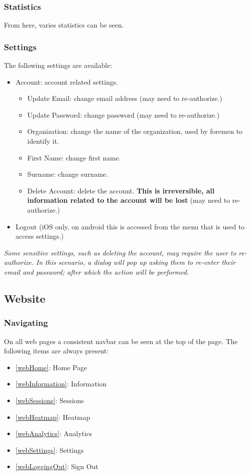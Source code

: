 \documentclass[11pt]{article}
\begin{document}
\subsubsection{Statistics}
\label{Mobile Statistics}

From here, varies statistics can be seen.

\subsubsection{Settings}
\label{Mobile Settings}

The following settings are available:
\begin{itemize}
 \item Account: account related settings.
 \begin{itemize}
  \item Update Email: change email address (may need to re-authorize.)
  \item Update Password: change password (may need to re-authorize.)
  \item Organization: change the name of the organization, used by foremen to identify it.
  \item First Name: change first name.
  \item Surname: change surname.
  \item Delete Account: delete the account. \textbf{This is irreversible, all information related to the account will be lost} (may need to re-authorize.)
 \end{itemize}
 \item Logout (iOS only, on android this is accessed from the menu that is used to access settings.)
\end{itemize}
\textit{Some sensitive settings, such as deleting the account, may require the user to re-authorize. In this scenario, a dialog will pop up asking them to re-enter their email and password; after which the action will be performed.}

\subsection{Website}
\subsubsection{Navigating}
\label{webNavigating}
On all web pages a consistent navbar can be seen at the top of the page. The following items are always present:
\begin{itemize}
 \item \ref{webHome}: Home Page
 \item \ref{webInformation}: Information
 \item \ref{webSessions}: Sessions
 \item \ref{webHeatmap}: Heatmap
 \item \ref{webAnalytics}: Analytics
 \item \ref{webSettings}: Settings
 \item \ref{webLoggingOut}: Sign Out
\end{itemize}
\end{document}
